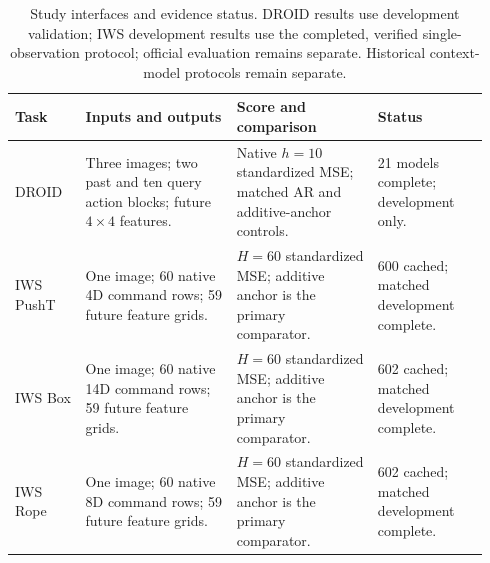 \begin{table}[!htb]
\centering
\caption{Study interfaces and evidence status. DROID results use development validation; IWS development results use the completed, verified single-observation protocol; official evaluation remains separate. Historical context-model protocols remain separate.}
\label{tab:experiment-alignment}
\begingroup\setlength{\tabcolsep}{3pt}
\begin{tabular}{@{}p{0.14\linewidth}p{0.30\linewidth}p{0.28\linewidth}p{0.22\linewidth}@{}}
\toprule Task & Inputs and outputs & Score and comparison & Status \\ \midrule
DROID & Three images; two past and ten query action blocks; future $4\!\times\!4$ features. & Native $h=10$ standardized MSE; matched AR and additive-anchor controls. & 21 models complete; development only. \\
IWS PushT & One image; 60 native 4D command rows; 59 future feature grids. & $H=60$ standardized MSE; additive anchor is the primary comparator. & 600 cached; matched development complete. \\
IWS Box & One image; 60 native 14D command rows; 59 future feature grids. & $H=60$ standardized MSE; additive anchor is the primary comparator. & 602 cached; matched development complete. \\
IWS Rope & One image; 60 native 8D command rows; 59 future feature grids. & $H=60$ standardized MSE; additive anchor is the primary comparator. & 602 cached; matched development complete. \\
\bottomrule\end{tabular}\endgroup
\end{table}

